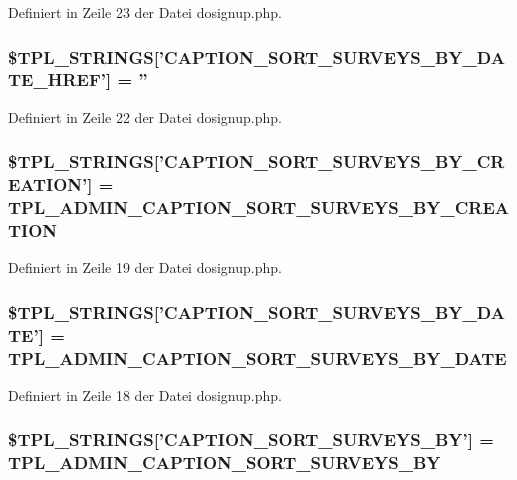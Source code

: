 Definiert in Zeile 23 der Datei dosignup.php.
\subsubsection{\setlength{\rightskip}{0pt plus 5cm}\$TPL\_\-STRINGS['CAPTION\_\-SORT\_\-SURVEYS\_\-BY\_\-DATE\_\-HREF'] = ''}\label{dosignup_8php_3f2c702d2b477122377566d7af8bab35}




Definiert in Zeile 22 der Datei dosignup.php.
\subsubsection{\setlength{\rightskip}{0pt plus 5cm}\$TPL\_\-STRINGS['CAPTION\_\-SORT\_\-SURVEYS\_\-BY\_\-CREATION'] = {\bf TPL\_\-ADMIN\_\-CAPTION\_\-SORT\_\-SURVEYS\_\-BY\_\-CREATION}}\label{dosignup_8php_67aeca80b1e96280795838ebd61aa624}




Definiert in Zeile 19 der Datei dosignup.php.
\subsubsection{\setlength{\rightskip}{0pt plus 5cm}\$TPL\_\-STRINGS['CAPTION\_\-SORT\_\-SURVEYS\_\-BY\_\-DATE'] = {\bf TPL\_\-ADMIN\_\-CAPTION\_\-SORT\_\-SURVEYS\_\-BY\_\-DATE}}\label{dosignup_8php_f7bf88f493ee13a399ae2c43b2214eb6}




Definiert in Zeile 18 der Datei dosignup.php.
\subsubsection{\setlength{\rightskip}{0pt plus 5cm}\$TPL\_\-STRINGS['CAPTION\_\-SORT\_\-SURVEYS\_\-BY'] = {\bf TPL\_\-ADMIN\_\-CAPTION\_\-SORT\_\-SURVEYS\_\-BY}}\label{dosignup_8php_94a5cf2d5e00990da2d11013ebd90ac7}




